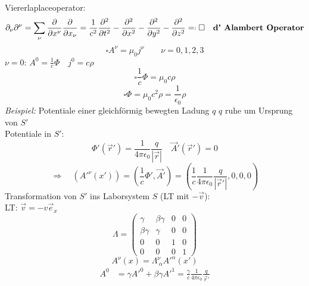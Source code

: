 \begin{enumerate}[1)]
\begin{align*}
	\end{align*}
	Viererlaplaceoperator:
	\begin{equation*}
	\partial_{\nu} \partial^{\nu} = \sum_{\nu} \prt{}{x^{\nu}} \prt{}{x_{\nu}} = \frac{1}{c^2} \prt{^2}{t^2} - \prt{^2}{x^2} - \prt{^2}{y^2} - \prt{^2}{z^2} \eqdef \square \quad \tx{\textbf{d' Alambert Operator}}
	\end{equation*}
	\begin{equation*}
	\square A^{\nu} = \mu_0 j^{\nu} \qquad \nu = 0, 1, 2, 3
	\end{equation*}
	$ \nu = 0 $: $ A^{0} = \frac{1}{c} \Phi \quad j^{0} = c \rho $
	\begin{equation*}
	\square \frac{1}{c} \Phi = \mu_0 c \rho
	\end{equation*}
	\begin{equation*}
	\square \Phi = \mu_0 c^2 \rho = \frac{1}{\epsilon_0} \rho
	\end{equation*}
	\emph{Beispiel:} Potentiale einer gleichförmig bewegten Ladung $ q $
	$ q $ ruhe um Ursprung von $ S' $\\[5pt]
	Potentiale in $ S' $:
	\begin{equation*}
	\Phi'(\vec{r}') = \frac{1}{4 \pi \epsilon_0} \frac{q}{|\vec{r}|} \quad \vec{A}'(\vec{r}') = 0
	\end{equation*}
	\begin{equation*}
	\Rightarrow \quad \left(A'^{\nu} (x')\right) = \left(\frac{1}{c} \Phi', \vec{A}'\right) = \left(\frac{1}{c} \frac{1}{4 \pi \epsilon_0} \frac{q}{|\vec{r}'|}, 0, 0, 0\right)
	\end{equation*}
	Transformation von $ S' $  ins Laborsystem $ S $ (LT mit $ - \vec{v} $):\\[5pt]
	LT: $ \vec{v} = -v \vec{e}_x $
	\begin{equation*}
	\Lambda = \begin{pmatrix}
	\gamma & \beta \gamma & 0 & 0 \\
	\beta \gamma & \gamma & 0 & 0 \\
	0 & 0 & 1 & 0 \\
	0 & 0 & 0 & 1
	\end{pmatrix}
	\end{equation*}
	\begin{equation*}
	A^{\nu} (x) = \Lambda^{\nu}_{\ \alpha} A'^{\alpha} (x')
	\end{equation*}
	\begin{align*}
	A^{0} &= \gamma A'^{0} + \beta \gamma A'^{1} = \frac{\gamma}{c} \frac{1}{4 \pi \epsilon_0} \frac{q}{\vec{r}'}\\

\end{align*}
\end{enumerate}
